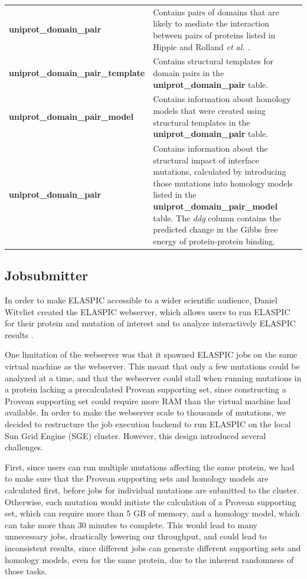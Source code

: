 \begin{table}[!tb]
\begin{tabular}{l | p{10cm}}
	\textbf{uniprot\_domain\_pair} & Contains pairs of domains that are likely to mediate the interaction between pairs of proteins listed in Hippie \cite{schaefer_hippie:_2012} and Rolland \textit{et al.} \cite{rolland_proteome-scale_2014}. \\
	\textbf{uniprot\_domain\_pair\_template} & Contains structural templates for domain pairs in the \textbf{uniprot\_domain\_pair} table. \\
	\textbf{uniprot\_domain\_pair\_model} & Contains information about homology models that were created using structural templates in the \textbf{uniprot\_domain\_pair} table. \\
	\textbf{uniprot\_domain\_pair} & Contains information about the structural impact of interface mutations, calculated by introducing those mutations into homology models listed in the \textbf{uniprot\_domain\_pair\_model} table. The \textit{ddg} column contains the predicted change in the Gibbs free energy of protein-protein binding. \\
	\bottomrule
\end{tabular}
\end{table}


\clearpage
\subsection{Jobsubmitter}

In order to make ELASPIC accessible to a wider scientific audience, Daniel Witvliet created the ELASPIC webserver, which allows users to run ELASPIC for their protein and mutation of interest and to analyze interactively ELASPIC results \cite{witvliet_elaspic_2016}.

One limitation of the webserver was that it spawned ELASPIC jobs on the same virtual machine as the webserver. This meant that only a few mutations could be analyzed at a time, and that the webserver could stall when running mutations in a protein lacking a precalculated Provean supporting set, since constructing a Provean supporting set could require more RAM than the virtual machine had available. In order to make the webserver scale to thousands of mutations, we decided to restructure the job execution backend to run ELASPIC on the local Sun Grid Engine (SGE) cluster. However, this design introduced several challenges.

First, since users can run multiple mutations affecting the same protein, we had to make sure that the Provean supporting sets and homology models are calculated first, before jobs for individual mutations are submitted to the cluster. Otherwise, each mutation would initiate the calculation of a Provean supporting set, which can require more than 5 GB of memory, and a homology model, which can take more than 30 minutes to complete. This would lead to many unnecessary jobs, drastically lowering our throughput, and could lead to inconsistent results, since different jobs can generate different supporting sets and homology models, even for the same protein, due to the inherent randomness of those tasks.

